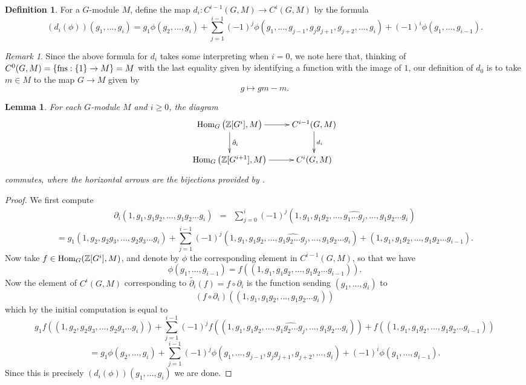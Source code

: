 \documentclass[11pt]{amsart}
\numberwithin{equation}{section}
\newtheorem{lemma}[equation]{Lemma}
\theoremstyle{remark}
\newtheorem{remark}[equation]{Remark}
\theoremstyle{remark}
\theoremstyle{remark}
\theoremstyle{definition}
\theoremstyle{definition}
\theoremstyle{definition}
\newtheorem{defi}[equation]{Definition}
\theoremstyle{definition}
\theoremstyle{definition}
\theoremstyle{definition}
\begin{document}
\begin{defi}
For a $G$-module $M$, define the map $d_i:C^{i-1}(G,M)\rightarrow C^{i}(G,M)$ by the formula
\[(d_i(\phi))(g_1,...,g_i)=g_1\phi(g_2,...,g_i)+\sum_{j=1}^{i-1}(-1)^j\phi(g_1,...,g_{j-1},g_jg_{j+1},g_{j+2},...,g_i)+(-1)^{i}\phi(g_1,...,g_{i-1}).\]
\end{defi}

\begin{remark} \label{i=0 remark}
Since the above formula for $d_i$ takes some interpreting when $i=0$, we note here that, thinking of $C^0(G,M)=\{\textup{fns}:\{1\}\rightarrow M\}=M$ with the last equality given by identifying a function with the image of $1$, our definition of $d_0$ is to take $m\in M$ to the map $G\rightarrow M$ given by
\[g\mapsto gm-m.\] 
\end{remark}

\begin{lemma} \label{pushing accross the map d}
For each $G$-module $M$ and $i\geq 0$, the diagram
\[
\xymatrix{\textup{Hom}_G\left(\mathbb{Z}[G^{i}],M\right)\ar[r] \ar[d]^{\tilde{\partial}_i}& C^{i-1}(G,M)\ar[d]^{d_i}\\
\textup{Hom}_G\left(\mathbb{Z}[G^{i+1}],M\right)\ar[r] & C^i(G,M)
}
\]
commutes, where the horizontal arrows are the bijections provided by .
\end{lemma}

\begin{proof}
We first compute
\begin{eqnarray*}\partial_i(1,g_1,g_1g_2,...,g_1g_2...g_i)&=&\sum_{j=0}^i(-1)^j(1,g_1,g_1g_2,...,\widehat{g_1...g_j},...,g_1g_2...g_i)
\end{eqnarray*}
\[=g_1(1,g_2,g_2g_3,...,g_2g_3...g_i)+\sum_{j=1}^{i-1}(-1)^j(1,g_1,g_1g_2,...,\widehat{g_1g_2...g_j},...,g_1g_2...g_i)+(1,g_1,g_1g_2,...,g_1g_2...g_{i-1}).\]
Now take $f\in \textup{Hom}_G(\mathbb{Z}[G^i],M)$, and denote by $\phi$ the corresponding element in $C^{i-1}(G,M)$, so that we have 
\[\phi(g_1,...,g_{i-1})=f((1,g_1,g_1g_2,...,g_1g_2...g_{i-1})).\]
Now the element of $C^i(G,M)$ corresponding to $\tilde{\partial_i}(f)=f\circ \partial_i$ is the function sending $(g_1,...,g_i)$ to
\[(f\circ \partial_i)((1,g_1,g_1g_2,...,g_1g_2...g_i))\]
which by the initial computation is equal to
\[g_1f((1,g_2,g_2g_3,...,g_2g_3...g_i))+\sum_{j=1}^{i-1}(-1)^jf((1,g_1,g_1g_2,...,\widehat{g_1g_2...g_j},...,g_1g_2...g_i))+f((1,g_1,g_1g_2,...,g_1g_2...g_{i-1}))\]
\[=g_1\phi(g_2,...,g_i)+\sum_{j=1}^{i-1}(-1)^j\phi(g_1,...,g_{j-1},g_jg_{j+1},g_{j+2},...,g_i)+(-1)^{i}\phi(g_1,...,g_{i-1}).\]
Since this is precisely $(d_i(\phi))(g_1,...,g_i)$ we are done.
\end{proof}
\end{document}
